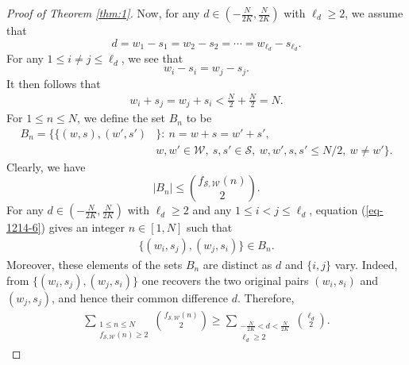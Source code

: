 \documentclass[12pt,a4paper,reqno]{amsart}
\numberwithin{equation}{section}
\theoremstyle{plain}
\theoremstyle{definition}
\begin{document}
\begin{proof}[Proof of Theorem \ref{thm:1}]
Now, for any $d\in \left(-\frac{N}{2K}, \frac{N}{2K}\right)$ with $\ell_d\ge 2$, we assume that
$$
d=w_1-s_1=w_2-s_2=\cdots=w_{\ell_d}-s_{\ell_d}.
$$
For any $1\le i\neq j\le \ell_d$, we see that
$$
w_i-s_i=w_j-s_j.
$$
It then follows that
\begin{align}\label{eq-1214-6}
w_i+s_j=w_j+s_i<\frac{N}{2}+\frac{N}{2}=N.
\end{align}
For $1\le n\le N$, we define the set $B_n$ to be
\begin{align*}
    B_n=\Big\{ \big\{(w,s), (w',s')  &\big\} :~  n=w+s=w'+s', \\
    &w, w'\in \mathscr{W},\ s,s'\in \mathscr{S},\ w, w', s, s' \le N/2,\ w\neq w' \Big\}.
\end{align*}
Clearly, we have
\[
 |B_n|\leq\binom{f_{\mathscr{S},\mathscr{W}}(n)}{2}.
\]
For any $d\in \left(-\frac{N}{2K}, \frac{N}{2K}\right)$ with $\ell_d\ge 2$ and any $1\le i<j\le \ell_d$, equation (\ref{eq-1214-6}) gives an integer $n\in[1,N]$ such that
\begin{align}\label{eq-0104-1}
    \Big\{(w_i,s_j),(w_j,s_i)\Big\}\in B_n.
\end{align}
Moreover, these elements of the sets $B_n$ are distinct as $d$ and $\{i,j\}$ vary. Indeed, from
$\big\{(w_i,s_j),(w_j,s_i)\big\}$ one recovers the two original pairs
$(w_i,s_i)$ and $(w_j,s_j)$, and hence their common difference $d$.
Therefore,
\begin{align}\label{eq-0104-2}
\sum_{\substack{1\leq n \leq N \\ f_{\mathscr{S}, \mathscr{W}}(n)\ge 2}}\binom{f_{\mathscr{S}, \mathscr{W}}(n)}{2}\geq \sum_{\substack{-\frac{N}{2K}<d<\frac{N}{2K}\\ \ell_d\ge 2}}\binom{\ell_d}{2}.
\end{align}


\end{proof}
\end{document}
